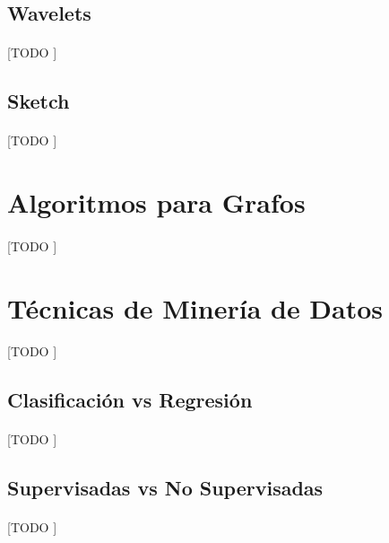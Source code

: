 \documentclass{article}
\begin{document}
    \subsection{Wavelets}

      \paragraph{}
      [TODO ]

    \subsection{Sketch}

      \paragraph{}
      [TODO ]

  \section{Algoritmos para Grafos}

    \paragraph{}
    [TODO ]

  \section{Técnicas de Minería de Datos}

    \paragraph{}
    [TODO ]

    \subsection{Clasificación vs Regresión}

      \paragraph{}
      [TODO ]

    \subsection{Supervisadas vs No Supervisadas}

      \paragraph{}
      [TODO ]
\end{document}
